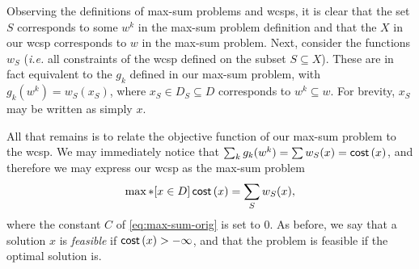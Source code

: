 Observing the definitions of max-sum problems and \glspl{wcsp}, it is clear that the set \(S\) corresponds to some \(w^k\) in the max-sum problem definition and that the \(X\) in our \gls{wcsp} corresponds to \(w\) in the max-sum problem.
Next, consider the functions \(w_S\) (\emph{i.e.} all constraints of the \gls{wcsp} defined on the subset \(S\subseteq X\)).
These are in fact equivalent to the \(g_k\) defined in our max-sum problem, with \(g_k(w^k) = w_S(x_S)\), where \(x_S \in D_S \subseteq D\) corresponds to \(w^k \subseteq w\).
For brevity, \(x_S\) may be written as simply \(x\).

All that remains is to relate the objective function of our max-sum problem to the \gls{wcsp}.
We may immediately notice that \(\sum_k g_k(w^k) = \sum w_S(x) = \operatorname{\mathsf{cost}}\left(x\right)\), and therefore we may express our \gls{wcsp} as the max-sum problem
\begin{equation}
	\label{eq:max-sum-wcsp}
	\max*[x\in D] \operatorname{\mathsf{cost}}\left(x\right) = \sum_S w_S(x),
\end{equation}
where the constant \(C\) of \eqref{eq:max-sum-orig} is set to \(0\).
As before, we say that a solution \(x\) is \emph{feasible} if \(\operatorname{\mathsf{cost}}\left(x\right)>-\infty\), and that the problem is feasible if the optimal solution is.

